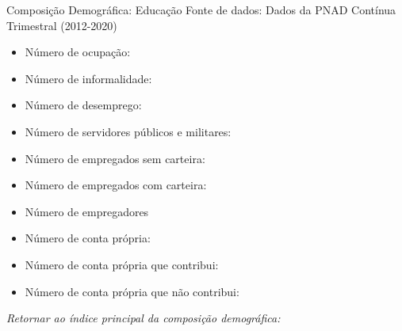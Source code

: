 \begin{frame}[label=_composicao_demografica_educacao]{Composição Demográfica: Educação}
{\footnotesize Fonte de dados: Dados da PNAD Contínua Trimestral (2012-2020)}
\begin{itemize}
\item{Número de ocupação: \hyperlink{_composicao_demografica_educacao_n_de_ocupacao}{}}
\item{Número de informalidade: \hyperlink{_composicao_demografica_educacao_n_de_informalidade}{}}
\item{Número de desemprego: \hyperlink{_composicao_demografica_educacao_n_de_desemprego}{}}
\item{Número de servidores públicos e militares: \hyperlink{_composicao_demografica_educacao_n_militar}{}}
\item{Número de empregados sem carteira: \hyperlink{_composicao_demografica_educacao_n_empregadoSC}{}}
\item{Número de empregados com carteira: \hyperlink{_composicao_demografica_educacao_n_empregadoCC}{}}
\item{Número de empregadores \hyperlink{_composicao_demografica_educacao_n_empregador}{}}
\item{Número de conta própria: \hyperlink{_composicao_demografica_educacao_n_cpropria}{}}
\item{Número de conta própria que contribui: \hyperlink{_composicao_demografica_educacao_n_cpropriaC}{}}
\item{Número de conta própria que não contribui: \hyperlink{_composicao_demografica_educacao_n_cpropriaNc}{}}
\end{itemize}

\begin{small}
\textit{Retornar ao índice principal da composição demográfica: \hyperlink{_composicao_demografica}{} }
\end{small}

\end{frame}

